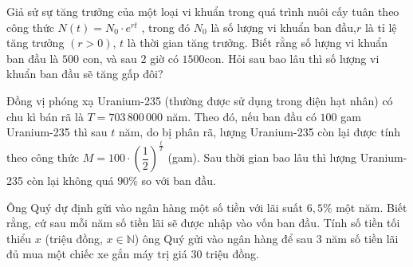 \begin{ex}%
	Giả sử sự tăng trưởng của một loại vi khuẩn trong quá trình nuôi cấy tuân theo công thức $ N(t) = N_{0}\cdot  e^{rt} $ , trong đó $ N_{0} $ là số lượng vi khuẩn ban đầu,$ r $ là tỉ lệ tăng trưởng $ (r > 0) $, $ t $ là thời gian tăng trưởng. Biết rằng số lượng vi khuẩn ban đầu là $ 500 $ con, và sau $ 2 $ giờ có $ 1500 $con. Hỏi sau bao lâu thì số lượng vi khuẩn ban đầu sẽ tăng gấp đôi?
\end{ex}

\begin{ex}%
	Đồng vị phóng xạ Uranium-235 (thường được sử dụng trong điện hạt nhân) có chu kì bán rã là $T=703\,800\,000$ năm. Theo đó, nếu ban đầu có $100$ gam Uranium-235 thì sau $t$ năm, do bị phân rã, lượng Uranium-235 còn lại được tính theo công thức $M=100\cdot\left(\dfrac{1}{2} \right)^{\tfrac{t}{T}}$ (gam). Sau thời  gian bao lâu thì lượng Uranium-235 còn lại không quá $90\%$ so với ban đầu.
\end{ex}

\begin{ex}%
	Ông Quý dự định gửi vào ngân hàng một số tiền với lãi suất $6{,}5\%$ một năm. Biết rằng, cứ sau mỗi năm số tiền lãi sẽ được nhập vào vốn ban đầu. Tính số tiền tối thiểu $x$ (triệu đồng, $x\in \mathbb{N}$) ông Quý gửi vào ngân hàng để sau $3$ năm số tiền lãi đủ mua một chiếc xe gắn máy trị giá 30 triệu đồng. 
\end{ex}

